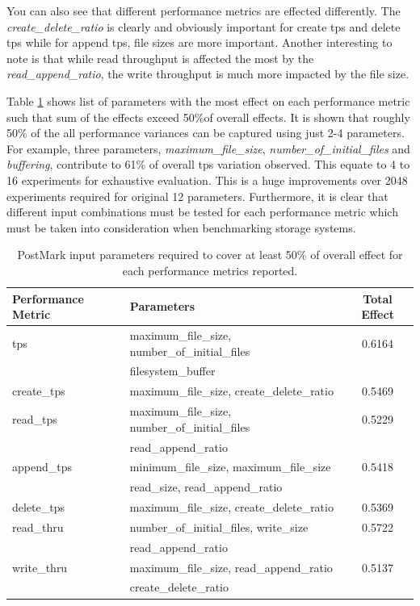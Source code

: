 You can also see that different performance metrics are effected differently. 
The \emph{create\_delete\_ratio} is clearly and obviously important for create tps and delete tps while for append tps, file sizes are more important. 
Another interesting to note is that while read throughput is affected the most by the \emph{read\_append\_ratio}, the write throughput is much more impacted by the file size.

Table \ref{pm_50_t} shows list of parameters with the most effect on each performance metric such that sum of the effects exceed 50\%of overall effects. 
It is shown that roughly 50\% of the all performance variances can be captured using just 2-4 parameters. 
For example, three parameters, \emph{maximum\_file\_size}, \emph{number\_of\_initial\_files} and \emph{buffering}, contribute to 61\% of overall tps variation observed. 
This equate to 4 to 16 experiments for exhaustive evaluation. 
This is a huge improvements over 2048 experiments required for original 12 parameters. 
Furthermore, it is clear that different input combinations must be tested for each performance metric which must be taken into consideration when benchmarking storage systems. 

\begin{table}[!t]
\caption{PostMark input parameters required to cover at least 50\% of overall effect for each performance metrics reported.}
\label{pm_50_t}
\centering
\begin{tabularx}{\textwidth}{
  l | 
  X 
  c
}
\hline
\bfseries Performance Metric   &\bfseries Parameters           &\bfseries Total Effect  \\
\hline\hline
tps           & maximum\_file\_size, number\_of\_initial\_files &0.6164   \\
              & filesystem\_buffer                              &         \\
\hline
create\_tps   & maximum\_file\_size, create\_delete\_ratio      &0.5469   \\
\hline
read\_tps     & maximum\_file\_size, number\_of\_initial\_files &0.5229   \\
              & read\_append\_ratio                             &         \\
\hline
append\_tps   & minimum\_file\_size, maximum\_file\_size        &0.5418   \\
              & read\_size, read\_append\_ratio                 &         \\
\hline
delete\_tps   & maximum\_file\_size, create\_delete\_ratio      &0.5369   \\
\hline
read\_thru    & number\_of\_initial\_files, write\_size         &0.5722   \\
              & read\_append\_ratio                             &         \\
\hline
write\_thru   & maximum\_file\_size, read\_append\_ratio        &0.5137   \\
              & create\_delete\_ratio                           &         \\
\hline
\end{tabularx}
\end{table}

